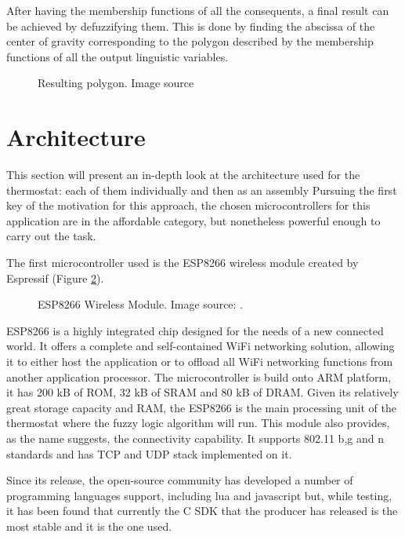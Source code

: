 \documentclass[conference]{IEEEtran}
\let\Oldsection\section
\renewcommand{\section}{\FloatBarrier\Oldsection}
\begin{document}
After having the membership functions of all the consequents, a final result can be achieved by defuzzifying
them. This is done by finding the abscissa of the center of gravity corresponding to the polygon described by the
membership functions of all the output linguistic variables.

\begin{figure}[h!]
\label{fig:nn}
\centerline{}
      \caption[MainModule]{Resulting polygon. Image source \cite{website:defuzzimg}}
\label{fig:mf_comparison}
\end{figure}


\section{Architecture}
\label{Architecture}

This section will present an in-depth look at the architecture used for the thermostat: each of them
individually and then as an assembly
Pursuing the first key of the motivation for this approach, the chosen microcontrollers for this
application are in the affordable category, but nonetheless powerful enough to carry out the task.

The first microcontroller used is the ESP8266 wireless module created by Espressif (Figure \ref{fig:esp8266}).

\begin{figure}[h!]
\label{fig:esp8266}
\centerline{}
      \caption[ESP8266]{ESP8266 Wireless Module. Image source: \cite{website:esppicture}.}
\label{fig:esp8266}
\end{figure}

ESP8266 is a highly integrated chip designed for the needs of a new connected world. It offers a complete and
self-contained WiFi networking solution, allowing it to either host the application or to offload all WiFi
networking functions from another application processor.\cite{website:espressifdesc}
The microcontroller is build onto ARM platform, it has 200 kB of ROM, 32 kB of SRAM and 80 kB of DRAM.
Given its relatively great storage capacity and RAM, the ESP8266 is the main processing unit of the thermostat
where the fuzzy logic algorithm will run.
This module also provides, as the name suggests, the connectivity capability. It supports 802.11 b,g and n
standards and has TCP and UDP stack implemented on it.

Since its release, the open-source community has developed a number of programming languages support, including
lua\cite{website:nodemcu} and javascript\cite{website:espruino} but, while testing, it has been found that
currently the C SDK that the producer has released is the most stable and it is the one used.
\end{document}
